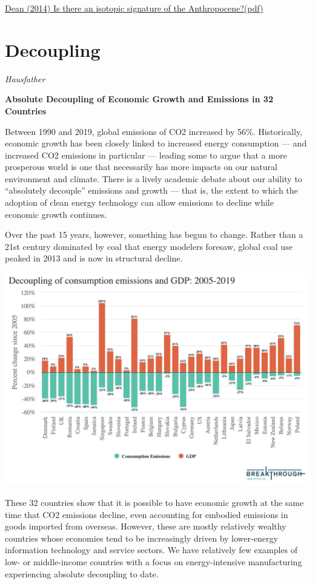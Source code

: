 \documentclass[
]{book}
\begin{document}
\href{pdf/Dean_2014_Isotopic_signature_of_Anthropocene.pdf}{Dean (2014) Is there an isotopic signature of the Anthropocene?(pdf)}

\hypertarget{decoupling}{%
\chapter{Decoupling}\label{decoupling}}

\emph{Hausfather}

\textbf{Absolute Decoupling of Economic Growth and Emissions in 32 Countries}

Between 1990 and 2019, global emissions of CO2 increased by 56\%. Historically, economic growth has been closely linked to increased energy consumption --- and increased CO2 emissions in particular --- leading some to argue that a more prosperous world is one that necessarily has more impacts on our natural environment and climate. There is a lively academic debate about our ability to ``absolutely decouple'' emissions and growth --- that is, the extent to which the adoption of clean energy technology can allow emissions to decline while economic growth continues.

Over the past 15 years, however, something has begun to change. Rather than a 21st century dominated by coal that energy modelers foresaw, global coal use peaked in 2013 and is now in structural decline.

\includegraphics{fig/hausfather_decoupling.png}

These 32 countries show that it is possible to have economic growth at the same time that CO2 emissions decline, even accounting for embodied emissions in goods imported from overseas. However, these are mostly relatively wealthy countries whose economies tend to be increasingly driven by lower-energy information technology and service sectors. We have relatively few examples of low- or middle-income countries with a focus on energy-intensive manufacturing experiencing absolute decoupling to date.
\end{document}
